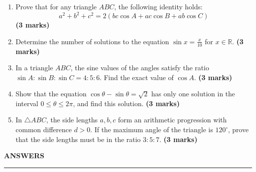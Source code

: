 \documentclass[11pt,a4paper]{article}
\begin{document}
\begin{enumerate}
    \item Prove that for any triangle $ABC$, the following identity holds:
    \begin{equation*}
    a^2 + b^2 + c^2 = 2(bc\cos A + ac\cos B + ab\cos C)
    \end{equation*} \hfill \textbf{(3 marks)}
    \vspace{0.5cm}

    \item Determine the number of solutions to the equation $\sin x = \frac{x}{10}$ for $x \in \mathbb{R}$. \hfill \textbf{(3 marks)}
    \vspace{0.5cm}

    \item In a triangle $ABC$, the sine values of the angles satisfy the ratio $\sin A : \sin B : \sin C = 4 : 5 : 6$. Find the exact value of $\cos A$. \hfill \textbf{(3 marks)}
    \vspace{0.5cm}

    \item Show that the equation $\cos\theta - \sin\theta = \sqrt{2}$ has only one solution in the interval $0 \le \theta \le 2\pi$, and find this solution. \hfill \textbf{(3 marks)}
    \vspace{0.5cm}

    \item In $\triangle ABC$, the side lengths $a, b, c$ form an arithmetic progression with common difference $d > 0$. If the maximum angle of the triangle is $120^\circ$, prove that the side lengths must be in the ratio $3 : 5 : 7$. \hfill \textbf{(3 marks)}
    \vspace{0.5cm}
\end{enumerate}
\newpage
\begin{center}\Large \textbf{ANSWERS}\end{center}\vspace{0.2cm}\hrule\vspace{0.4cm}
\end{document}
